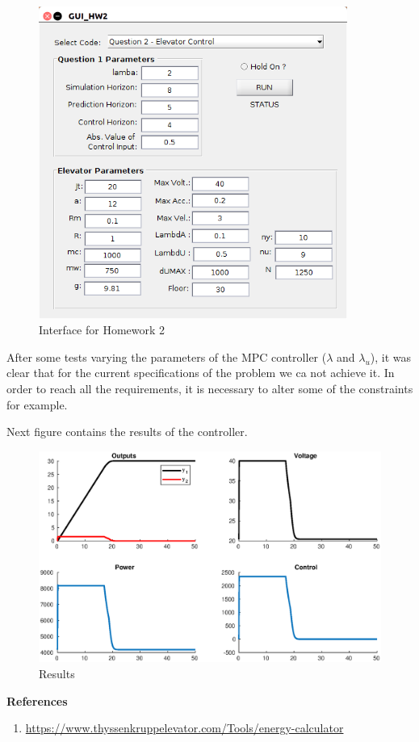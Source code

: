 \documentclass[12pt,a4paper]{article}
\begin{document}
\begin{figure}[H]
	\centering
    \includegraphics[width=0.9\textwidth]{GUI.png}
    \caption{Interface for Homework 2}
\end{figure}

After some tests varying the parameters of the MPC controller ($\lambda$ and $\lambda_u$), it was clear that for the current specifications of the problem we ca not achieve it. In order to reach all the requirements, it is necessary to alter some of the constraints for example. 

Next figure contains the results of the controller. 

\begin{figure}[H]
	\centering
    \includegraphics[width=\textwidth]{elevator.eps}
    \caption{Results}
\end{figure}

\textbf{References}
\begin{enumerate}
\item \url{https://www.thyssenkruppelevator.com/Tools/energy-calculator}
\end{enumerate}
\end{document}
